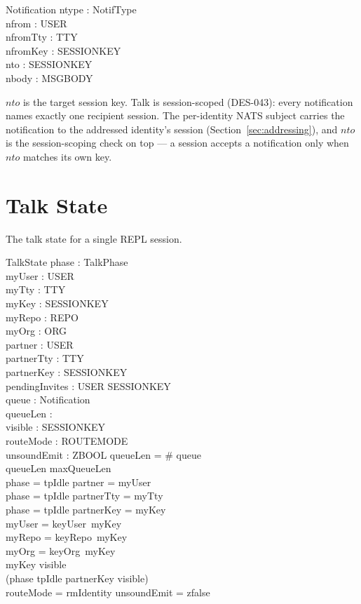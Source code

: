 \documentclass[a4paper,10pt,fleqn]{article}
\begin{document}
\begin{schema}{Notification}
  ntype : NotifType \\
  nfrom : USER \\
  nfromTty : TTY \\
  nfromKey : SESSIONKEY \\
  nto : SESSIONKEY \\
  nbody : MSGBODY
\end{schema}

$nto$ is the target session key.  Talk is session-scoped
(DES-043): every notification names exactly one recipient session.
The per-identity NATS subject carries the notification to the addressed
identity's session (Section~\ref{sec:addressing}), and $nto$ is the
session-scoping check on top --- a session accepts a notification only
when $nto$ matches its own key.

\section{Talk State}

The talk state for a single REPL session.

\begin{schema}{TalkState}
  phase : TalkPhase \\
  myUser : USER \\
  myTty : TTY \\
  myKey : SESSIONKEY \\
  myRepo : REPO \\
  myOrg : ORG \\
  partner : USER \\
  partnerTty : TTY \\
  partnerKey : SESSIONKEY \\
  pendingInvites : USER \pfun SESSIONKEY \\
  queue : \seq Notification \\
  queueLen : \nat \\
  visible : \power SESSIONKEY \\
  routeMode : ROUTEMODE \\
  unsoundEmit : ZBOOL
\where
  queueLen = \# queue \\
  queueLen \leq maxQueueLen \\
  phase = tpIdle \implies partner = myUser \\
  phase = tpIdle \implies partnerTty = myTty \\
  phase = tpIdle \implies partnerKey = myKey \\
  myUser = keyUser~myKey \\
  myRepo = keyRepo~myKey \\
  myOrg = keyOrg~myKey \\
  myKey \notin visible \\
  (phase \neq tpIdle \implies partnerKey \in visible) \\
  routeMode = rmIdentity \implies unsoundEmit = zfalse
\end{schema}
\end{document}

